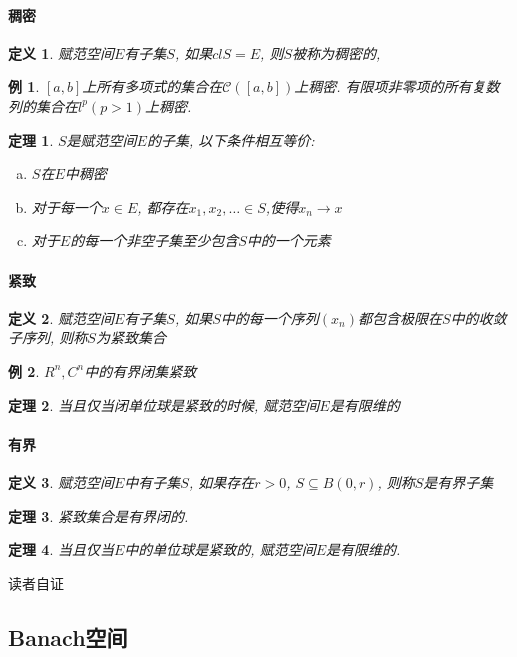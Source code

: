 \documentclass[a4paper,11pt]{article}
\newtheorem{definition}{\hspace{2em}定义}[section]
\newtheorem{theorem}{\hspace{2em}定理}[section]
\newtheorem{example}{例}[section]
\begin{document}
\paragraph*{稠密}
\begin{definition}
  赋范空间$E$有子集$S$, 如果$cl S=E$, 则$S$被称为稠密的,
\end{definition}
\begin{example}
  $[a,b]$上所有多项式的集合在$\mathcal{C}([a,b])$上稠密. 有限项非零项的所有复数列的集合在$l^p(p>1)$上稠密.
\end{example}
\begin{theorem}
  $S$是赋范空间$E$的子集, 以下条件相互等价:
  \begin{enumerate}[(a)]
    \item $S$在$E$中稠密
    \item 对于每一个$x\in E$, 都存在$x_1,x_2,\dots\in S$,使得$x_n\to x$
    \item 对于$E$的每一个非空子集至少包含$S$中的一个元素
  \end{enumerate}
\end{theorem}
\paragraph*{紧致}
\begin{definition}
  赋范空间$E$有子集$S$, 如果$S$中的每一个序列$(x_n)$都包含极限在$S$中的收敛子序列, 则称$S$为紧致集合
\end{definition}
\begin{example}
  $R^n,C^n$中的有界闭集紧致
\end{example}
\begin{theorem}
  当且仅当闭单位球是紧致的时候, 赋范空间$E$是有限维的
\end{theorem}
\paragraph*{有界}
\begin{definition}
  赋范空间$E$中有子集$S$, 如果存在$r>0$, $S\subseteq B(0,r)$, 则称$S$是有界子集
\end{definition}
\begin{theorem}
  紧致集合是有界闭的.
\end{theorem}
\begin{theorem}
  当且仅当$E$中的单位球是紧致的, 赋范空间$E$是有限维的.
\end{theorem}
读者自证
\subsection{Banach空间}
\end{document}
